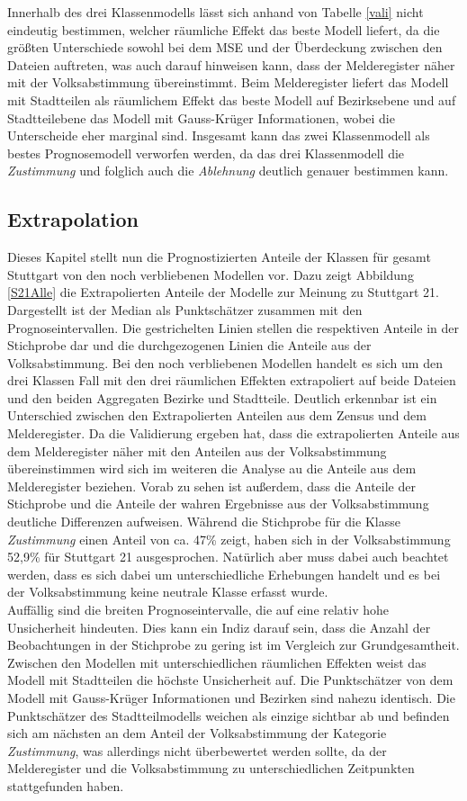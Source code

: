 \documentclass{Vorlage}
\begin{document}
Innerhalb des drei Klassenmodells lässt sich anhand von Tabelle \ref{vali} nicht eindeutig bestimmen, welcher räumliche Effekt das beste Modell liefert, da die größten Unterschiede sowohl bei dem MSE und der Überdeckung zwischen den Dateien auftreten, was auch darauf hinweisen kann, dass der Melderegister näher mit der Volksabstimmung übereinstimmt. Beim Melderegister liefert das Modell mit Stadtteilen als räumlichem Effekt das beste Modell auf Bezirksebene und auf Stadtteilebene das Modell mit Gauss-Krüger Informationen, wobei die Unterscheide eher marginal sind. Insgesamt kann das zwei Klassenmodell als bestes Prognosemodell verworfen werden, da das drei Klassenmodell die \textit{Zustimmung} und folglich auch die \textit{Ablehnung} deutlich genauer bestimmen kann.

\subsection{Extrapolation}

Dieses Kapitel stellt nun die Prognostizierten Anteile der Klassen für gesamt Stuttgart von den noch verbliebenen Modellen vor. Dazu zeigt Abbildung \ref{S21Alle} die Extrapolierten Anteile der Modelle zur Meinung zu Stuttgart 21. Dargestellt ist der Median als Punktschätzer zusammen mit den Prognoseintervallen. Die gestrichelten Linien stellen die respektiven Anteile in der Stichprobe dar und die durchgezogenen Linien die Anteile aus der Volksabstimmung. Bei den noch verbliebenen Modellen handelt es sich um den drei Klassen Fall mit den drei räumlichen Effekten extrapoliert auf beide Dateien und den beiden Aggregaten Bezirke und Stadtteile. Deutlich erkennbar ist ein Unterschied zwischen den Extrapolierten Anteilen aus dem Zensus und dem Melderegister. Da die Validierung ergeben hat, dass die extrapolierten Anteile aus dem Melderegister näher mit den Anteilen aus der Volksabstimmung übereinstimmen wird sich im weiteren die Analyse au die Anteile aus dem Melderegister beziehen. Vorab zu sehen ist außerdem, dass die Anteile der Stichprobe und die Anteile der wahren Ergebnisse aus der Volksabstimmung deutliche Differenzen aufweisen. Während die Stichprobe für die Klasse \textit{Zustimmung} einen Anteil von ca. 47\% zeigt, haben sich in der Volksabstimmung 52,9\% für Stuttgart 21 ausgesprochen. Natürlich aber muss dabei auch beachtet werden, dass es sich dabei um unterschiedliche Erhebungen handelt und es bei der Volksabstimmung keine neutrale Klasse erfasst wurde.\\
Auffällig sind die breiten Prognoseintervalle, die auf eine relativ hohe Unsicherheit hindeuten. Dies kann ein Indiz darauf sein, dass die Anzahl der Beobachtungen in der Stichprobe zu gering ist im Vergleich zur Grundgesamtheit. Zwischen den Modellen mit unterschiedlichen räumlichen Effekten weist das Modell mit Stadtteilen die höchste Unsicherheit auf. Die Punktschätzer von dem Modell mit Gauss-Krüger Informationen und Bezirken sind nahezu identisch. Die Punktschätzer des Stadtteilmodells weichen als einzige sichtbar ab und befinden sich am nächsten an dem Anteil der Volksabstimmung der Kategorie \textit{Zustimmung}, was allerdings nicht überbewertet werden sollte, da der Melderegister und die Volksabstimmung zu unterschiedlichen Zeitpunkten stattgefunden haben. 
\end{document}
